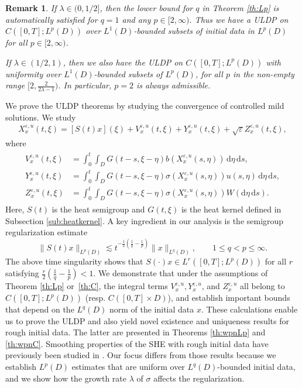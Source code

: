 \documentclass[10pt,a4paper]{amsart}
\newtheorem{remark}[theorem]{Remark}
\numberwithin{equation}{section}
\newcommand{\eps}{\varepsilon}
\newcommand{\dd}{\,\mathrm{d}}
\newcommand{\ddd}{\mathrm{d}}
\begin{document}
\begin{remark}
If $\lambda\in(0,1/2]$, then the lower bound for $q$ in Theorem \ref{th:Lp} is automatically satisfied for $q=1$ and any  $p\in[2,\infty)$.  
Thus we have a ULDP on $C([0,T];L^p(D))$ over $L^1(D)$-bounded subsets of initial data in $L^p(D)$ for all $p\in [2,\infty)$. 

If $\lambda\in(1/2,1)$, then we also have the ULDP on $C([0,T];L^p(D))$ with uniformity over $L^1(D)$-bounded subsets of $L^p(D)$, for all $p$ in the non-empty range $[2,\frac{2}{2\lambda-1})$. In particular,  $p=2$ is always admissible.
\end{remark}


We prove the ULDP theorems by studying the convergence of controlled mild solutions. We study
\begin{align*} 
  X_x^{\eps,u}(t,\xi) = [S(t)x](\xi)+V^{\eps,u}_x(t,\xi)+Y_x^{\eps,u}(t,\xi)+\sqrt{\eps}Z_x^{\eps,u}(t,\xi),
\end{align*}
where  
\begin{align*} 
\begin{split}
V^{\eps,u}_x(t,\xi) &=  
  \int_0^t \int_D G(t-s,\xi-\eta)b(X_x^{\eps,u}(s,\eta))\dd \eta\dd s, \\
  Y_x^{\eps,u}(t,\xi) &=  
  \int_0^t \int_D G(t-s,\xi-\eta)\sigma(X_x^{\eps,u}(s,\eta))u(s,\eta)\dd \eta\dd s, \\
  Z_x^{\eps,u}(t,\xi) &=   
  \int_0^t\int_D G(t-s,\xi-\eta)\sigma(X_x^{\eps,u}(s,\eta))W(\ddd\eta\dd s).\end{split}
\end{align*}
Here, $S(t)$ is the heat semigroup and $G(t,\xi)$ is the heat kernel defined in Subsection \ref{sub:heatkernel}. 
A key ingredient in our analysis is the semigroup regularization estimate  
\[\|S(t)x\|_{L^p(D)} \lesssim t^{-\frac{1}{2}(\frac{1}{q} - \frac{1}{p})}\|x\|_{L^q(D)}, \qquad 
 1\leq q< p \leq \infty
.\]
The above time singularity shows that $S(\cdot)x \in L^r([0,T];L^p(D))$ for all $r$ satisfying $\frac{r}{2}(\frac{1}{q} - \frac{1}{p})<1$.
We demonstrate that under the assumptions of Theorem  \ref{th:Lp} or\ \ref{th:C}, the integral terms $V^{\eps,u}_x, Y^{\eps,u}_x$, and $Z^{\eps,u}_x$ all belong to $C([0,T];L^p(D))$ (resp. $C([0,T]\times D)$), and establish important bounds that depend on the $L^q(D)$ norm of the initial data $x$. 
These calculations enable us to prove the ULDP and also yield novel existence and uniqueness results for rough initial data. The latter are presented in Theorems  \ref{th:wpnLp} and \ref{th:wpnC}. Smoothing properties of the SHE with rough initial data have previously been studied in  \cite{CD2014,CD2015,CH2019,CH2023,CCY2024,CK2019,FKN2025,SWZ2026,CX2026}. Our focus differs from  those results because we establish $L^p(D)$ estimates that are uniform over $L^q(D)$-bounded initial data, and we show how the growth rate $\lambda$ of $\sigma$ affects the regularization. 
 
\end{document}
